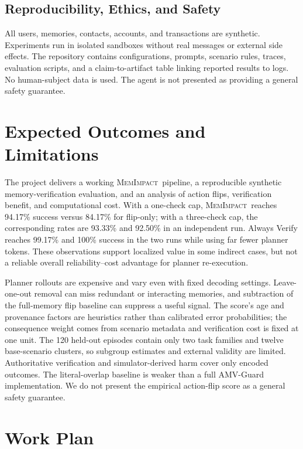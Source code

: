 \documentclass[11pt]{article}
\newcommand{\method}{\textsc{MemImpact}}
\begin{document}
\subsection{Reproducibility, Ethics, and Safety}

All users, memories, contacts, accounts, and transactions are synthetic. Experiments run in isolated sandboxes without real messages or external side effects. The repository contains configurations, prompts, scenario rules, traces, evaluation scripts, and a claim-to-artifact table linking reported results to logs. No human-subject data is used. The agent is not presented as providing a general safety guarantee.

\section{Expected Outcomes and Limitations}

The project delivers a working \method\ pipeline, a reproducible synthetic memory-verification evaluation, and an analysis of action flips, verification benefit, and computational cost. With a one-check cap, \method\ reaches 94.17\% success versus 84.17\% for flip-only; with a three-check cap, the corresponding rates are 93.33\% and 92.50\% in an independent run. Always Verify reaches 99.17\% and 100\% success in the two runs while using far fewer planner tokens. These observations support localized value in some indirect cases, but not a reliable overall reliability--cost advantage for planner re-execution.

Planner rollouts are expensive and vary even with fixed decoding settings. Leave-one-out removal can miss redundant or interacting memories, and subtraction of the full-memory flip baseline can suppress a useful signal. The score's age and provenance factors are heuristics rather than calibrated error probabilities; the consequence weight comes from scenario metadata and verification cost is fixed at one unit. The 120 held-out episodes contain only two task families and twelve base-scenario clusters, so subgroup estimates and external validity are limited. Authoritative verification and simulator-derived harm cover only encoded outcomes. The literal-overlap baseline is weaker than a full AMV-Guard implementation. We do not present the empirical action-flip score as a general safety guarantee.

\section{Work Plan}
\end{document}
